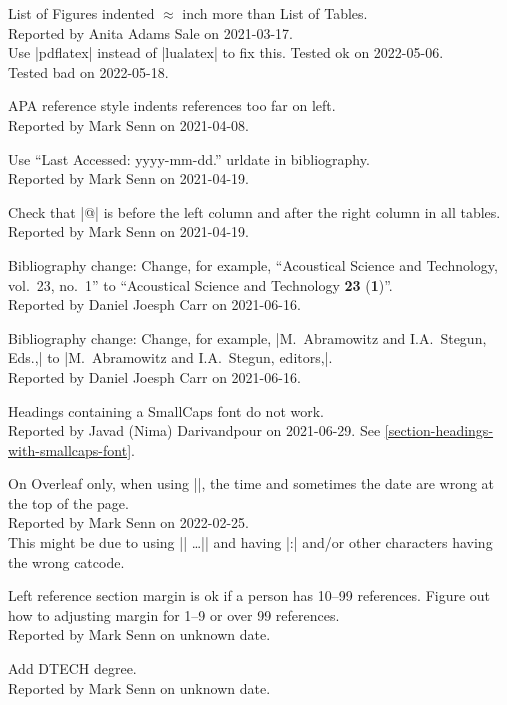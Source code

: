 List of Figures indented $\approx$ inch
more than List of Tables.\\
Reported by Anita Adams Sale on 2021-03-17.\\
Use |pdflatex| instead of |lualatex| to fix this.
Tested ok on 2022-05-06.\\
Tested bad on 2022-05-18.

APA reference style indents references too far on left.\\
Reported by Mark Senn on 2021-04-08.

Use ``Last Accessed: yyyy-mm-dd.'' urldate in bibliography.\\
Reported by Mark Senn on 2021-04-19.

Check that |@{}| is before the left column
and after the right column in all tables.\\
Reported by Mark Senn on 2021-04-19.

Bibliography change:
Change,
for example,
``Acoustical Science and Technology, vol.~23, no.~1''
to
``Acoustical Science and Technology {\bfseries 23\/} ({\bfseries 1\/})''.\\
Reported by Daniel Joesph Carr on 2021-06-16.

Bibliography change:
Change,
for example,
|M.~Abramowitz and I.A.~Stegun, Eds.,|
to
|M.~Abramowitz and I.A.~Stegun, editors,|.\\
Reported by Daniel Joesph Carr on 2021-06-16.

Headings containing a SmallCaps font do not work.\\
Reported by Javad (Nima) Darivandpour on 2021-06-29.
See \ref{section-headings-with-smallcaps-font}.

On Overleaf only,
when using
|\def\ZZshowtimestamp{true}|,
the time and sometimes the date
are wrong at the top of the page.\\
Reported by Mark Senn on 2022-02-25.\\
This might be due to using
|\ExplSyntaxOn| \ldots |\ExplSyntaxOff|
and having |:| and/or other characters having the wrong catcode.

Left reference section margin is ok if a person has 10--99 references.
Figure out how to adjusting margin for 1--9 or over 99 references.\\
Reported by Mark Senn on unknown date.

Add DTECH degree.\\
Reported by Mark Senn on unknown date.

